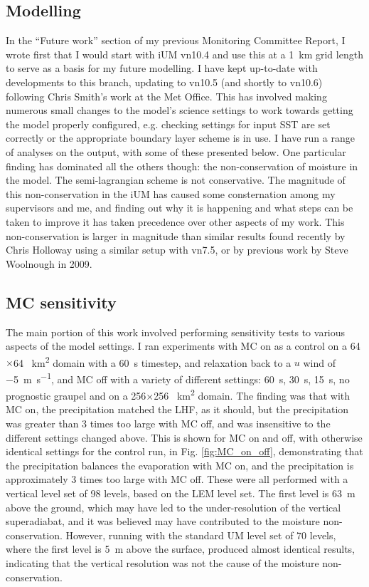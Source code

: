 \documentclass[11pt,a4paper]{article}
\begin{document}
\subsection{Modelling}
\label{sec:modelling}
In the ``Future work'' section of my previous Monitoring Committee Report, I wrote first that I would start with iUM vn10.4 and use this at a \SI{1}{km} grid length to serve as a basis for my future modelling. I have kept up-to-date with developments to this branch, updating to vn10.5 (and shortly to vn10.6) following Chris Smith's work at the Met Office. This has involved making numerous small changes to the model's science settings to work towards getting the model properly configured, e.g. checking settings for input SST are set correctly or the appropriate boundary layer scheme is in use. I have run a range of analyses on the output, with some of these presented below. One particular finding has dominated all the others though: the non-conservation of moisture in the model. The semi-lagrangian scheme is not conservative. The magnitude of this non-conservation in the iUM has caused some consternation among my supervisors and me, and finding out why it is happening and what steps can be taken to improve it has taken precedence over other aspects of my work. This non-conservation is larger in magnitude than similar results found recently by Chris Holloway using a similar setup with vn7.5, or by previous work by Steve Woolnough in 2009.

\subsection{MC sensitivity}
\label{sec:MC_sensitivity}
The main portion of this work involved performing sensitivity tests to various aspects of the model settings. I ran experiments with MC on as a control on a 64$\times$64 \SI{}{km^2} domain with a \SI{60}{s} timestep, and relaxation back to a $u$ wind of \SI{-5}{m.s^{-1}}, and MC off with a variety of different settings: \SI{60}{s}, \SI{30}{s}, \SI{15}{s}, no prognostic graupel and on a 256$\times$256 \SI{}{km^2} domain. The finding was that with MC on, the precipitation matched the LHF, as it should, but the precipitation was greater than 3 times too large with MC off, and was insensitive to the different settings changed above. This is shown for MC on and off, with otherwise identical settings for the control run, in Fig. \ref{fig:MC_on_off}, demonstrating that the precipitation balances the evaporation with MC on, and the precipitation is approximately 3 times too large with MC off. These were all performed with a vertical level set of 98 levels, based on the LEM level set. The first level is \SI{63}{m} above the ground, which may have led to the under-resolution of the vertical superadiabat, and it was believed may have contributed to the moisture non-conservation. However, running with the standard UM level set of 70 levels, where the first level is \SI{5}{m} above the surface, produced almost identical results, indicating that the vertical resolution was not the cause of the moisture non-conservation. 
\end{document}
